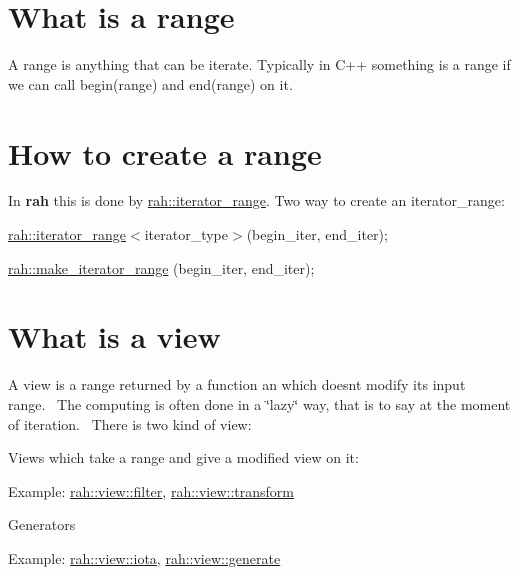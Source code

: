 \section*{What is a range}

A range is anything that can be iterate. Typically in C++ something is a range if we can call {\ttfamily begin(range)} and {\ttfamily end(range)} on it.

\section*{How to create a range}

In {\bfseries{rah}} this is done by {\ttfamily \mbox{\hyperlink{structrah_1_1iterator__range}{rah\+::iterator\+\_\+range}}}. Two way to create an iterator\+\_\+range\+:
\begin{DoxyItemize}
\item {\ttfamily \mbox{\hyperlink{structrah_1_1iterator__range}{rah\+::iterator\+\_\+range}}$<$iterator\+\_\+type$>$(begin\+\_\+iter, end\+\_\+iter);}
\item {\ttfamily \mbox{\hyperlink{namespacerah_a0a3dd43bb465c99137bfdebb2292b102}{rah\+::make\+\_\+iterator\+\_\+range}} (begin\+\_\+iter, end\+\_\+iter);}
\end{DoxyItemize}

\section*{What is a view}

A view is a range returned by a function an which doesn\textquotesingle{}t modify it\textquotesingle{}s input range.~\newline
 The computing is often done in a \char`\"{}lazy\char`\"{} way, that is to say at the moment of iteration.~\newline
 There is two kind of view\+:
\begin{DoxyItemize}
\item Views which take a range and give a modified view on it\+:
\begin{DoxyItemize}
\item Example\+: {\ttfamily \mbox{\hyperlink{namespacerah_1_1view_a1eade9e2861e5bdae07b01ac9bf2c10c}{rah\+::view\+::filter}}}, {\ttfamily \mbox{\hyperlink{namespacerah_1_1view_ad8750f5c95edcf4f26b0a1c1eec3d676}{rah\+::view\+::transform}}}
\end{DoxyItemize}
\item Generators
\begin{DoxyItemize}
\item Example\+: {\ttfamily \mbox{\hyperlink{namespacerah_1_1view_ae66c3be408888c58118b1974cdece592}{rah\+::view\+::iota}}}, {\ttfamily \mbox{\hyperlink{namespacerah_1_1view_a9851b1ee90ae15252fb248417e084f69}{rah\+::view\+::generate}}}
\end{DoxyItemize}
\end{DoxyItemize}

